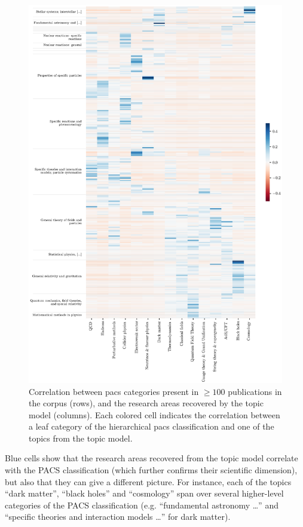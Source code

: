 \documentclass{article}
\begin{document}
\begin{figure}[H]
    \centering
    \includegraphics[height=0.72\paperheight
]{Fig15}
    \caption{Correlation between \gls{pacs} categories present in $\geq 100$ publications in the corpus (rows), and the research areas recovered by the topic model (columns). Each colored cell indicates the correlation between a leaf category of the hierarchical \gls{pacs} classification and one of the topics from the topic model.}
\end{figure}

Blue cells show that the research areas recovered from the topic model correlate with the PACS classification (which further confirms their scientific dimension), but also that they can give a different picture. For instance, each of the topics  ``dark matter'', ``black holes'' and ``cosmology'' span over several higher-level categories of the PACS classification (e.g. ``fundamental astronomy \dots'' and ``specific theories and interaction models \dots'' for dark matter).
\end{document}
